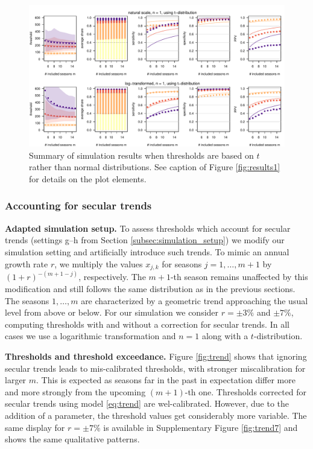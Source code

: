 \documentclass[12pt]{article}
\begin{document}
\begin{figure}[h!]
\begin{center}
\includegraphics[width = \textwidth]{figure/plot_t_fr_small.pdf}
\end{center}
\caption{Summary of simulation results when thresholds are based on $t$ rather than normal distributions. See caption of Figure \ref{fig:results1} for details on the plot elements.}
\label{fig:t}
\end{figure}

\subsubsection{Accounting for secular trends}
\label{subsec:results_trends}

\textbf{Adapted simulation setup.} To assess thresholds which account for secular trends (settings g--h from Section \ref{subsec:simulation_setup}) we modify our simulation setting and artificially introduce such trends. To mimic an annual growth rate $r$, we multiply the values $x_{j, k}$ for seasons $j = 1, \dots, m + 1$ by $(1 + r)^{-(m + 1 - j)}$, respectively. The $m + 1$-th season remains unaffected by this modification and still follows the same distribution as in the previous sections. The seasons $1, \dots, m$ are characterized by a geometric trend approaching the usual level from above or below. For our simulation we consider $r = \pm 3\%$ and $\pm 7\%$, computing thresholds with and without a correction for secular trends. In all cases we use a logarithmic transformation and $n = 1$ along with a $t$-distribution.

\noindent \textbf{Thresholds and threshold exceedance.} Figure \ref{fig:trend} shows that ignoring secular trends leads to mis-calibrated thresholds, with stronger miscalibration for larger $m$. This is expected as seasons far in the past in expectation differ more and more strongly from the upcoming $(m + 1)$-th one. Thresholds corrected for secular trends using model \eqref{eq:trend} are wel-calibrated. However, due to the addition of a parameter, the threshold values get considerably more variable. The same display for $r = \pm 7\%$ is available in Supplementary Figure \ref{fig:trend7} and shows the same qualitative patterns.
\end{document}
